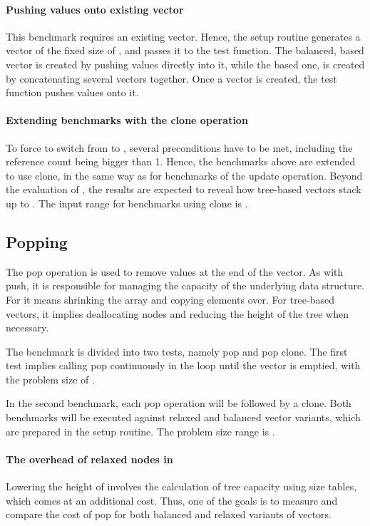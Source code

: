 \paragraph*{Pushing values onto existing vector}
This benchmark requires an existing vector. Hence, the setup routine generates a vector of the fixed size of \n{}, and passes it to the test function. The balanced, \rbtree{} based vector is created by pushing values directly into it, while the \rrbtree{} based one, is created by concatenating several vectors together. Once a vector is created, the test function pushes \n{} values onto it. 

\paragraph*{Extending benchmarks with the clone operation}
To force \pvec{} to switch from \stdvec{} to \rrbvec{}, several preconditions have to be met, including the reference count being bigger than 1. Hence, the benchmarks above are extended to use clone, in the same way as for benchmarks of the update operation. Beyond the evaluation of \pvec{}, the results are expected to reveal how tree-based vectors stack up to \stdvec{}. The input range for benchmarks using clone is \range{[10, 20k]}.

\subsection{Popping}
The pop operation is used to remove values at the end of the vector. As with push, it is responsible for managing the capacity of the underlying data structure. For \stdvec{} it means shrinking the array and copying elements over. For tree-based vectors, it implies deallocating nodes and reducing the height of the tree when necessary. 

The benchmark is divided into two tests, namely pop and pop clone. The first test implies calling pop continuously in the loop until the vector is emptied, with the problem size of \range{[10, 60000]}. 

In the second benchmark, each pop operation will be followed by a clone. Both benchmarks will be executed against relaxed and balanced vector variants, which are prepared in the setup routine. The problem size range is \range{[10, 20000]}.

\paragraph*{The overhead of relaxed nodes in \rrbtree{}}
Lowering the height of \rrbtree{} involves the calculation of tree capacity using size tables, which comes at an additional cost. Thus, one of the goals is to measure and compare the cost of pop for both balanced and relaxed variants of vectors. 

